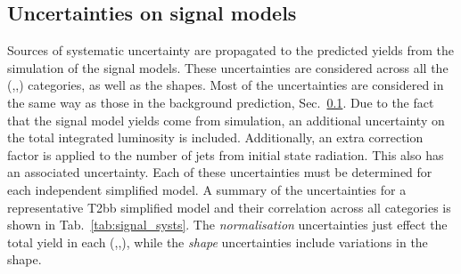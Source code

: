 
\subsection{Uncertainties on signal models}

Sources of systematic uncertainty are propagated to the predicted
yields from the \MC simulation of the signal models. These
uncertainties are considered across all the (\HT,\nj,\nb) categories,
as well as the \MHT shapes. Most of the uncertainties are considered
in the same way as those in the \SM background prediction,
Sec.~\ref{}. Due to the fact that the signal model yields come from
simulation, an additional uncertainty on the total integrated
luminosity is included. Additionally, an extra correction factor is
applied to the number of jets from initial state radiation. This also
has an associated uncertainty. Each of these uncertainties must be
determined for each independent simplified model. A summary of the
uncertainties for a representative T2bb simplified model and their
correlation across all categories is shown in
Tab.~\ref{tab:signal_systs}. The \emph{normalisation} uncertainties
just effect the total yield in each (\HT,\nj,\nb), while the
\emph{shape} uncertainties include variations in the \MHT shape.  

